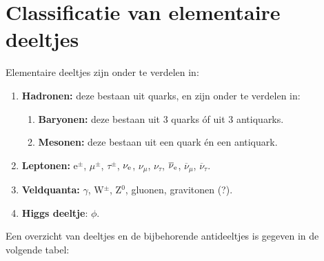 \section[~~Classificatie van elementaire deeltjes]{Classificatie van elementaire deeltjes}
Elementaire deeltjes zijn onder te verdelen in:
\begin{enumerate}
\setlength{\itemsep}{0mm}
\item {\bf Hadronen:} deze bestaan uit quarks, en zijn onder te verdelen in:
      \begin{enumerate}
      \setlength{\itemsep}{0mm}
      \item {\bf Baryonen:} deze bestaan uit 3 quarks \'of uit 3 antiquarks.
      \item {\bf Mesonen:} deze bestaan uit een quark \'en een antiquark.
      \end{enumerate}
\item {\bf Leptonen:} e$^\pm$, $\mu^\pm$, $\tau^\pm$, $\nu_{\rm e}$, $\nu_\mu$, $\nu_\tau$,
      $\overline{\nu}_{\rm e}$, $\overline{\nu}_\mu$, $\overline{\nu}_\tau$.
\item {\bf Veldquanta:} $\gamma$, W$^\pm$, Z$^0$, gluonen, gravitonen (?).
\item {\bf Higgs deeltje}: $\phi$.
\end{enumerate}
Een overzicht van deeltjes en de bijbehorende antideeltjes is gegeven in de
volgende tabel:
